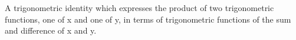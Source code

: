 A trigonometric identity which expresses the product of two trigonometric functions, 
one of x and one of y, in terms of trigonometric functions of the sum and
difference of x and y.